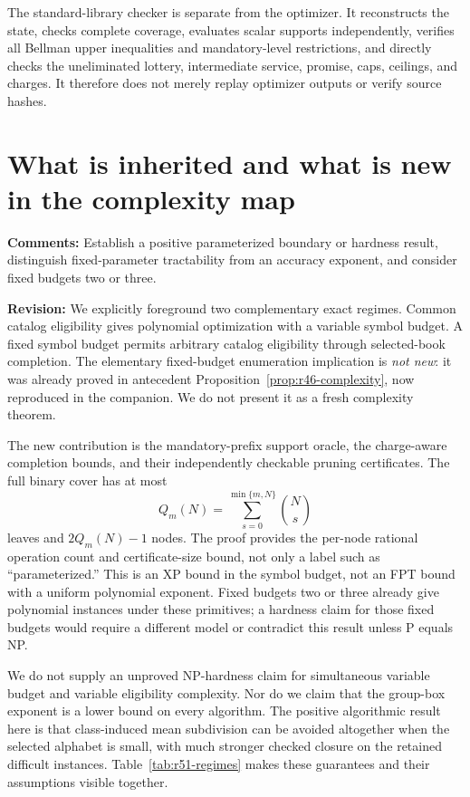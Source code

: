 \documentclass[11pt,letterpaper]{article}
\begin{document}
The standard-library checker is separate from the optimizer. It reconstructs the state, checks complete coverage, evaluates scalar supports independently, verifies all Bellman upper inequalities and mandatory-level restrictions, and directly checks the uneliminated lottery, intermediate service, promise, caps, ceilings, and charges. It therefore does not merely replay optimizer outputs or verify source hashes.

\section{What is inherited and what is new in the complexity map}
\textbf{Comments:} Establish a positive parameterized boundary or hardness result, distinguish fixed-parameter tractability from an accuracy exponent, and consider fixed budgets two or three.

\textbf{Revision:} We explicitly foreground two complementary exact regimes. Common catalog eligibility gives polynomial optimization with a variable symbol budget. A fixed symbol budget permits arbitrary catalog eligibility through selected-book completion. The elementary fixed-budget enumeration implication is \emph{not new}: it was already proved in antecedent Proposition~\ref{prop:r46-complexity}, now reproduced in the companion. We do not present it as a fresh complexity theorem.

The new contribution is the mandatory-prefix support oracle, the charge-aware completion bounds, and their independently checkable pruning certificates. The full binary cover has at most
\[
 Q_m(N)=\sum_{s=0}^{\min\{m,N\}}\binom Ns
\]
leaves and $2Q_m(N)-1$ nodes. The proof provides the per-node rational operation count and certificate-size bound, not only a label such as ``parameterized.'' This is an XP bound in the symbol budget, not an FPT bound with a uniform polynomial exponent. Fixed budgets two or three already give polynomial instances under these primitives; a hardness claim for those fixed budgets would require a different model or contradict this result unless P equals NP.

We do not supply an unproved NP-hardness claim for simultaneous variable budget and variable eligibility complexity. Nor do we claim that the group-box exponent is a lower bound on every algorithm. The positive algorithmic result here is that class-induced mean subdivision can be avoided altogether when the selected alphabet is small, with much stronger checked closure on the retained difficult instances. Table~\ref{tab:r51-regimes} makes these guarantees and their assumptions visible together.
\end{document}
